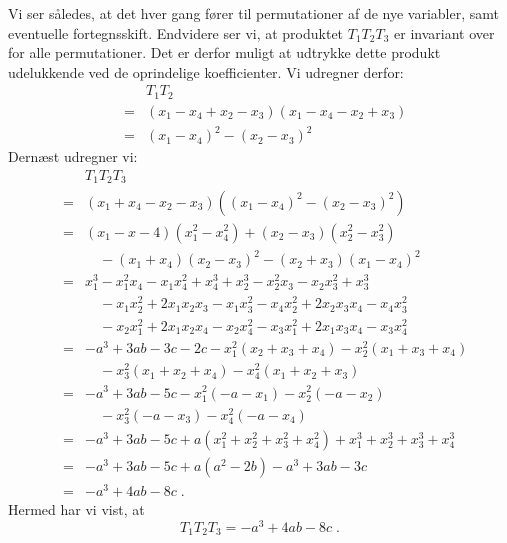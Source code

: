 \documentclass[12pt,oneside,a4paper]{article}
\newcommand{\bas}{\begin{eqnarray*}}
\newcommand{\eas}{\end{eqnarray*}}
\begin{document}
Vi ser således, at det hver gang fører til permutationer af de nye
variabler, samt eventuelle fortegnsskift. Endvidere ser vi, at produktet
$T_1 T_2 T_3$ er invariant over for alle permutationer. Det er derfor
muligt at udtrykke dette produkt udelukkende ved de oprindelige koefficienter.
Vi udregner derfor:
\bas
&& T_1 T_2 \\
&=& (x_1-x_4+x_2-x_3)(x_1-x_4-x_2+x_3) \\
&=& (x_1-x_4)^2 - (x_2-x_3)^2
\eas
Dernæst udregner vi:
\bas
&& T_1T_2T_3 \\
&=& (x_1+x_4-x_2-x_3)((x_1-x_4)^2 - (x_2-x_3)^2) \\
&=& (x_1-x-4)(x_1^2-x_4^2) + (x_2-x_3)(x_2^2-x_3^2) \\
&& \quad - (x_1+x_4)(x_2-x_3)^2 - (x_2+x_3)(x_1-x_4)^2 \\
&=& x_1^3 - x_1^2x_4 - x_1x_4^2 + x_4^3 + x_2^3 - x_2^2x_3 - x_2x_3^2 + x_3^3 \\
&& \quad - x_1x_2^2 + 2x_1x_2x_3 - x_1x_3^2 - x_4x_2^2 + 2x_2x_3x_4 - x_4x_3^2 \\
&& \quad - x_2x_1^2 + 2x_1x_2x_4 - x_2x_4^2 - x_3x_1^2 + 2x_1x_3x_4 - x_3x_4^2 \\
&=& -a^3 + 3ab - 3c - 2c - x_1^2(x_2+x_3+x_4) - x_2^2(x_1+x_3+x_4) \\
&& \quad - x_3^2(x_1+x_2+x_4) - x_4^2(x_1+x_2+x_3) \\
&=& -a^3 + 3ab - 5c - x_1^2(-a-x_1) - x_2^2(-a-x_2) \\
&& \quad - x_3^2(-a-x_3) - x_4^2(-a-x_4) \\
&=& -a^3 + 3ab - 5c + a(x_1^2+x_2^2+x_3^2+x_4^2) + x_1^3+x_2^3+x_3^3+x_4^3 \\
&=& -a^3 + 3ab - 5c + a(a^2-2b) - a^3 + 3ab - 3c \\
&=& -a^3 + 4ab - 8c \;.
\eas
Hermed har vi vist, at
\begin{equation}
T_1T_2T_3 = -a^3 + 4ab - 8c \;.
\label{t123}
\end{equation}
\end{document}
